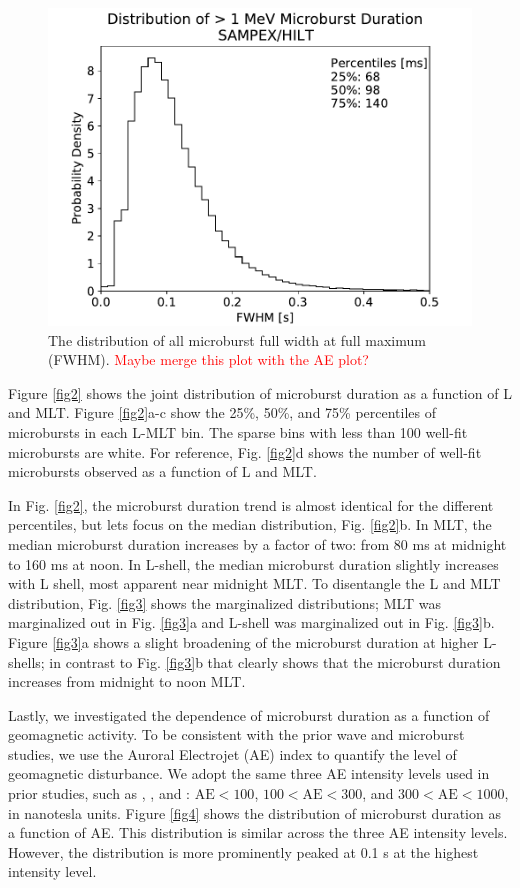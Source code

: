 \documentclass[draft]{agujournal2019}
\begin{document}
\begin{figure}
\noindent\includegraphics[width=\textwidth]{figures/figX.pdf}
\caption{The distribution of all microburst full width at full maximum (FWHM). \textcolor{red}{Maybe merge this plot with the AE plot?}}
\label{figX}
\end{figure}

Figure \ref{fig2} shows the joint distribution of microburst duration as a function of L and MLT. Figure \ref{fig2}a-c show the 25\%, 50\%, and 75\% percentiles of microbursts in each L-MLT bin. The sparse bins with less than 100 well-fit microbursts are white. For reference, Fig. \ref{fig2}d shows the number of well-fit microbursts observed as a function of L and MLT.

In Fig. \ref{fig2}, the microburst duration trend is almost identical for the different percentiles, but lets focus on the median distribution, Fig. \ref{fig2}b. In MLT, the median microburst duration increases by a factor of two: from 80 ms at midnight to 160 ms at noon. In L-shell, the median microburst duration slightly increases with L shell, most apparent near midnight MLT. To disentangle the L and MLT distribution, Fig. \ref{fig3} shows the marginalized distributions; MLT was marginalized out in Fig. \ref{fig3}a and L-shell was marginalized out in Fig. \ref{fig3}b. Figure \ref{fig3}a shows a slight broadening of the microburst duration at higher L-shells; in contrast to Fig. \ref{fig3}b that clearly shows that the microburst duration increases from midnight to noon MLT.

Lastly, we investigated the dependence of microburst duration as a function of geomagnetic activity. To be consistent with the prior wave and microburst studies, we use the Auroral Electrojet (AE) index to quantify the level of geomagnetic disturbance. We adopt the same three AE intensity levels used in prior studies, such as , , and : $\mathrm{AE} < 100$, $100 < \mathrm{AE} < 300$, and $300 < \mathrm{AE} < 1000$, in nanotesla units. Figure \ref{fig4} shows the distribution of microburst duration as a function of AE. This distribution is similar across the three AE intensity levels. However, the distribution is more prominently peaked at 0.1 s at the highest intensity level.
\end{document}

